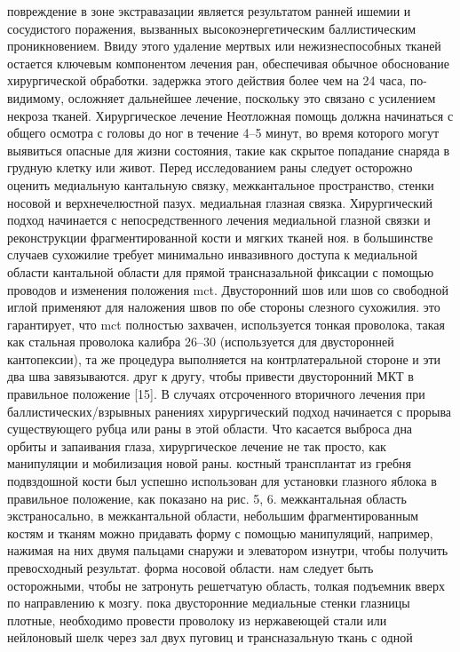 повреждение в зоне экстравазации является результатом ранней ишемии и
сосудистого поражения, вызванных высокоэнергетическим баллистическим
проникновением. Ввиду этого удаление мертвых или нежизнеспособных тканей
остается ключевым компонентом лечения ран, обеспечивая обычное обоснование
хирургической обработки. задержка этого действия более чем на 24 часа,
по-видимому, осложняет дальнейшее лечение, поскольку это связано с усилением
некроза тканей. Хирургическое лечение Неотложная помощь должна начинаться с
общего осмотра с головы до ног в течение 4–5 минут, во время которого могут
выявиться опасные для жизни состояния, такие как скрытое попадание снаряда в
грудную клетку или живот. Перед исследованием раны следует осторожно оценить
медиальную кантальную связку, межкантальное пространство, стенки носовой и
верхнечелюстной пазух. медиальная глазная связка. Хирургический подход
начинается с непосредственного лечения медиальной глазной связки и реконструкции
фрагментированной кости и мягких тканей ноя. в большинстве случаев сухожилие
требует минимально инвазивного доступа к медиальной области кантальной области
для прямой трансназальной фиксации с помощью проводов и изменения положения mct.
Двусторонний шов или шов со свободной иглой применяют для наложения швов по обе
стороны слезного сухожилия. это гарантирует, что mct полностью захвачен,
используется тонкая проволока, такая как стальная проволока калибра 26–30
(используется для двусторонней кантопексии), та же процедура выполняется на
контрлатеральной стороне и эти два шва завязываются. друг к другу, чтобы
привести двусторонний МКТ в правильное положение [15]. В случаях отсроченного
вторичного лечения при баллистических/взрывных ранениях хирургический подход
начинается с прорыва существующего рубца или раны в этой области. Что касается
выброса дна орбиты и запаивания глаза, хирургическое лечение не так просто, как
манипуляции и мобилизация новой раны. костный трансплантат из гребня подвздошной
кости был успешно использован для установки глазного яблока в правильное
положение, как показано на рис. 5, 6. межкантальная область экстраносально, в
межкантальной области, небольшим фрагментированным костям и тканям можно
придавать форму с помощью манипуляций, например, нажимая на них двумя пальцами
снаружи и элеватором изнутри, чтобы получить превосходный результат. форма
носовой области. нам следует быть осторожными, чтобы не затронуть решетчатую
область, толкая подъемник вверх по направлению к мозгу. пока двусторонние
медиальные стенки глазницы плотные, необходимо провести проволоку из нержавеющей
стали или нейлоновый шелк через зал двух пуговиц и трансназальную ткань с одной
